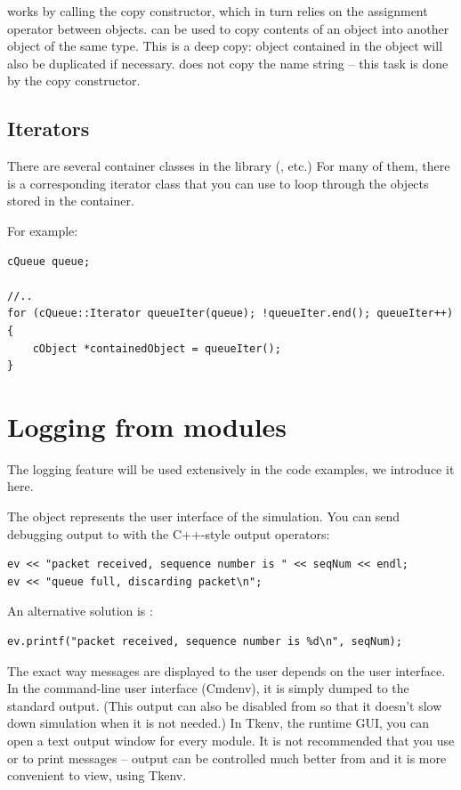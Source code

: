  works by calling the copy constructor, which in
turn relies on the assignment operator between objects.
 can be used to copy contents of an object into
another object of the same type. This is a deep copy: object
contained in the object will also be duplicated if necessary.
 does not copy the name string -- this task is done
by the copy constructor.


\subsection{Iterators}


There are several container classes in the library (,
 etc.) For many of them, there is a corresponding
iterator class that you can use to loop through the objects stored in
the container.

For example:

\begin{verbatim}
cQueue queue;

//..
for (cQueue::Iterator queueIter(queue); !queueIter.end(); queueIter++)
{
    cObject *containedObject = queueIter();
}
\end{verbatim}


\section{Logging from modules}

The logging feature will be used extensively in the code examples,
we introduce it here.

The  object represents the user interface of the
simulation.  You can send debugging output to  with the C++-style
output operators:

\begin{verbatim}
ev << "packet received, sequence number is " << seqNum << endl;
ev << "queue full, discarding packet\n";
\end{verbatim}

An alternative solution is :

\begin{verbatim}
ev.printf("packet received, sequence number is %d\n", seqNum);
\end{verbatim}

The exact way messages are displayed to the user depends on the user
interface. In the command-line user interface (Cmdenv),
it is simply dumped to the standard output. (This output can also be
disabled from  so that it doesn't slow down simulation
when it is not needed.) In Tkenv, the runtime GUI, you can open
a text output window for every module.
It is not recommended that you use  or 
to print messages --  output can be controlled much better
from  and it is more convenient to view, using Tkenv.

